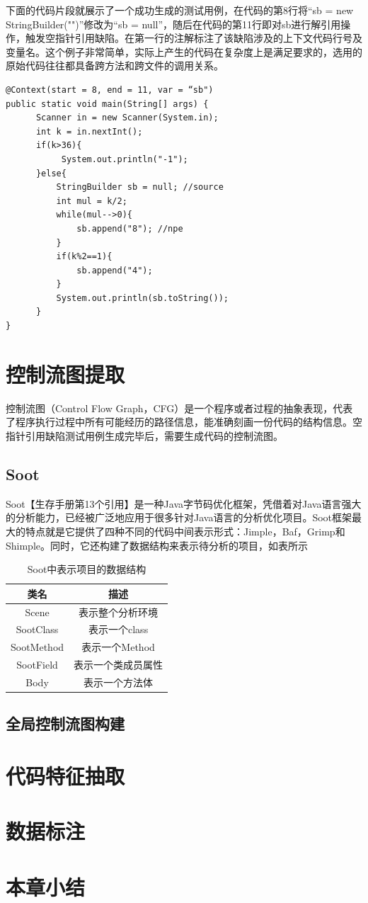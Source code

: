 下面的代码片段就展示了一个成功生成的测试用例，在代码的第8行将“sb = new StringBuilder("")”修改为“sb = null”，随后在代码的第11行即对sb进行解引用操作，触发空指针引用缺陷。在第一行的注解标注了该缺陷涉及的上下文代码行号及变量名。这个例子非常简单，实际上产生的代码在复杂度上是满足要求的，选用的原始代码往往都具备跨方法和跨文件的调用关系。 

\begin{lstlisting}[language={[AspectJ]Java},keywordstyle=\color{blue!70},commentstyle=\color{red!50!green!50!blue!50},frame=shadowbox, rulesepcolor=\color{red!20!green!20!blue!20}] 
@Context(start = 8, end = 11, var = “sb")
public static void main(String[] args) {
      Scanner in = new Scanner(System.in); 
      int k = in.nextInt();
      if(k>36){
           System.out.println("-1");
      }else{
          StringBuilder sb = null; //source                 
          int mul = k/2;
          while(mul-->0){
              sb.append("8"); //npe
          }
          if(k%2==1){
              sb.append("4");
          }
          System.out.println(sb.toString());
      }
}
\end{lstlisting}

\section{控制流图提取}
控制流图（Control Flow Graph，CFG）是一个程序或者过程的抽象表现，代表了程序执行过程中所有可能经历的路径信息，能准确刻画一份代码的结构信息。空指针引用缺陷测试用例生成完毕后，需要生成代码的控制流图。
\subsection{Soot}
Soot【生存手册第13个引用】是一种Java字节码优化框架，凭借着对Java语言强大的分析能力，已经被广泛地应用于很多针对Java语言的分析优化项目。Soot框架最大的特点就是它提供了四种不同的代码中间表示形式：Jimple，Baf，Grimp和Shimple。同时，它还构建了数据结构来表示待分析的项目，如表所示
\begin{table}
	\centering
	\caption{Soot中表示项目的数据结构} \label{tab:table4-1}
	\begin{tabular*}{0.9\textwidth}{@{\extracolsep{\fill}}cc}
		\toprule
		类名	&描述	 \\
		\midrule
		Scene	&表示整个分析环境\\
		SootClass	&表示一个class	\\
		SootMethod	&表示一个Method	 \\
		SootField	&表示一个类成员属性	\\
		Body	&表示一个方法体 \\
		\bottomrule
	\end{tabular*}
\end{table}
\subsection{全局控制流图构建}
\section{代码特征抽取}
\section{数据标注}
\section{本章小结}